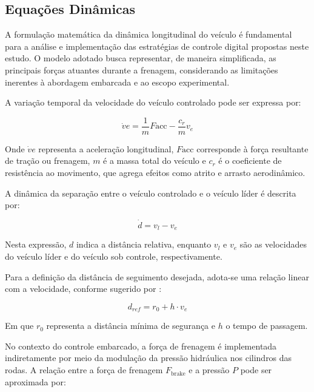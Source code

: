 \subsection{Equações Dinâmicas}
\label{sec:controle-4-1-3}

A formulação matemática da dinâmica longitudinal do veículo é fundamental para a análise e implementação das estratégias de controle digital propostas neste estudo. O modelo adotado busca representar, de maneira simplificada, as principais forças atuantes durante a frenagem, considerando as limitações inerentes à abordagem embarcada e ao escopo experimental.

A variação temporal da velocidade do veículo controlado pode ser expressa por:

\begin{equation} \dot{v}e = \frac{1}{m} F{\text{acc}} - \frac{c_r}{m} v_e \end{equation}

Onde $\dot{v}e$ representa a aceleração longitudinal, $F{\text{acc}}$ corresponde à força resultante de tração ou frenagem, $m$ é a massa total do veículo e $c_r$ é o coeficiente de resistência ao movimento, que agrega efeitos como atrito e arrasto aerodinâmico.

A dinâmica da separação entre o veículo controlado e o veículo líder é descrita por:

\begin{equation} \dot{d} = v_l - v_e \end{equation}

Nesta expressão, $d$ indica a distância relativa, enquanto $v_l$ e $v_e$ são as velocidades do veículo líder e do veículo sob controle, respectivamente.

Para a definição da distância de seguimento desejada, adota-se uma relação linear com a velocidade, conforme sugerido por :

\begin{equation} d_{ref} = r_0 + h \cdot v_e \end{equation}

Em que $r_0$ representa a distância mínima de segurança e $h$ o tempo de passagem.

No contexto do controle embarcado, a força de frenagem é implementada indiretamente por meio da modulação da pressão hidráulica nos cilindros das rodas. A relação entre a força de frenagem $F_{\text{brake}}$ e a pressão $P$ pode ser aproximada por:


